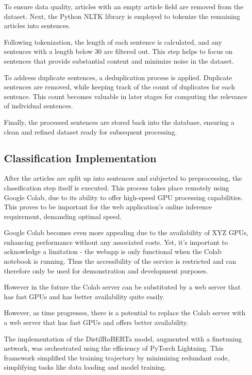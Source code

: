 \documentclass[a4paper,10pt]{report} %
\begin{document}
To ensure data quality, articles with an empty article field are removed from the dataset. Next, the Python NLTK library is employed to tokenize the remaining articles into sentences.

Following tokenization, the length of each sentence is calculated, and any sentences with a length below 30 are filtered out. This step helps to focus on sentences that provide substantial content and minimize noise in the dataset.

To address duplicate sentences, a deduplication process is applied. Duplicate sentences are removed, while keeping track of the count of duplicates for each sentence. This count becomes valuable in later stages for computing the relevance of individual sentences.

Finally, the processed sentences are stored back into the database, ensuring a clean and refined dataset ready for subsequent processing.

\subsection{Classification Implementation}
After the articles are split up into sentences and subjected to preprocessing, the classification step itself is executed. This process takes place remotely using Google Colab, due to its ability to offer high-speed GPU processing capabilities. This proves to be important for the web application's online inference requirement, demanding optimal speed.

Google Colab becomes even more appealing due to the availability of XYZ GPUs, enhancing performance without any associated costs. Yet, it's important to acknowledge a limitation - the webapp is only functional when the Colab notebook is running. Thus the accessibility of the service is restricted and can therefore only be used for demonstration and development purposes.

However in the future the Colab server can be substituted by a web server that has fast GPUs and has better availability quite easily.

However, as time progresses, there is a potential to replace the Colab server with a web server that has fast GPUs and offers better availability.

The implementation of the DistilRoBERTa model, augmented with a finetuning network, was orchestrated using the efficiency of PyTorch Lightning. This framework simplified the training trajectory by minimizing redundant code, simplifying tasks like data loading and model training.
\end{document}
